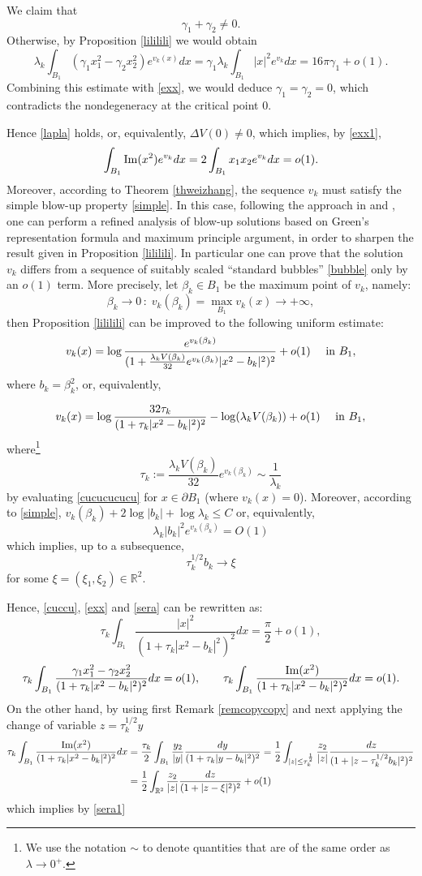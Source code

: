 \documentclass[reqno,11pt]{amsart}
\theoremstyle{definition}
\numberwithin{equation}{section}
\newcommand{\R}{\mathbb{R}}
\newcommand{\la}{\lambda}
\newcommand{\into}{\int_{B_1}}
\renewcommand{\(}{\left(}
\renewcommand{\)}{\right)}
\renewcommand{\[}{\left[}
\renewcommand{\]}{\right]}
\newcommand{\beq}{\begin{equation}}
\newcommand{\eeq}{\end{equation}}
\def\Im{{\rm Im}}
\begin{document}
{\medskip

We claim that 
\beq\label{lapla}\gamma_1+\gamma_2 \neq 0.\eeq Otherwise, by Proposition \ref{lililili} we would obtain 
$$\la_k\int_{B_1}(\gamma_1 x_1^2-\gamma_2 x_2^2) e^{v_k(x)}dx=\gamma_1 \la_k\int_{B_1}|x|^2 e^{v_k} dx =16\pi \gamma_1  +o(1).$$
Combining this estimate with \eqref{exx}, we would deduce $\gamma_1=\gamma_2=0$, which contradicts the nondegeneracy at the critical point $0$. 

Hence \eqref{lapla} holds, or, equivalently, $\Delta V(0)\neq 0$, which implies, by \eqref{exx1}, \beq\label{sera} \into \Im(x^2) e^{v_k} dx=2\into x_1x_2 e^{v_k} dx=o(1).\eeq Moreover, according to Theorem \ref{thweizhang},   the sequence $v_k$ must satisfy the simple blow-up property \eqref{simple}. 
In this case, following the approach in   \cite{gluck2012} and \cite{zhang2006}, one can perform  a refined analysis of blow-up solutions based on  Green’s representation formula and maximum principle argument,  in order to sharpen the result given in Proposition \ref{lililili}. 
 In particular one can prove that the solution
$v_k$ differs from a sequence of suitably scaled  “standard bubbles” \eqref{bubble} only by an 
$o(1)$  term.
More precisely, let $\beta_k\in B_1$ be the maximum point of $v_k$, namely: $$\beta_k\to 0 \, : \;v_k(\beta_k)=\max_{B_1} v_k(x)\to +\infty,$$
then Proposition \ref{lililili} can be improved to the following uniform estimate: 
$$v_k(x)= \log \frac{e^{v_k(\beta_k)}}{(1+ \frac{\la_k V(\beta_k)}{32 }e^{v_k(\beta_k)}|x^{2}-b_k|^2)^2}+o(1)\quad \hbox{ in }B_1,$$
 where $b_k=\beta_k^{2}$, or, equivalently,

\beq\label{cucucucucu}v_k(x)= \log \frac{32\tau_k}{(1+ \tau_k|x^{2}-b_k|^2)^2}-\log(\la_kV(\beta_k))+o(1)\quad \hbox{ in }B_1,\eeq
where\footnote{We use the notation $\sim$ to denote quantities that are of the same order as  $\la\to 0^+$. } $$\tau_k:=\frac{\la_k V(\beta_k)}{32}e^{v_k(\beta_k)}\sim\frac{1}{\la_k}$$ by evaluating \eqref{cucucucucu} for $x\in\partial B_1$ (where $v_k(x)=0$). Moreover, according to \eqref{simple},
$v_k(\beta_k)+2\log|b_k|+\log\la_k\leq C$ or, equivalently, $$\la_k|b_k|^2e^{v_k(\beta_k)}=O(1)$$ which implies, up to a subsequence,  $$\tau_k^{1/2}b_k\to \xi$$ for some $\xi=(\xi_1,\xi_2)\in\R^2$.

Hence, \eqref{cuccu}, \eqref{exx} and  \eqref{sera} can be rewritten as:
\beq\label{sera0} \tau_k\into   \frac{|x|^2}{(1+ \tau_k|x^{2}-b_k|^2)^2}  dx=\frac{\pi}{2}+o(1),\eeq 
 \beq\label{sera1}\tau_k\into   \frac{\gamma_1 x_1^2-\gamma_2 x_2^2}{(1+ \tau_k|x^{2}-b_k|^2)^2}  dx=o(1),\qquad\tau_k\into   \frac{\Im(x^2)}{(1+ \tau_k|x^{2}-b_k|^2)^2}  dx=o(1).\eeq
 On the other hand, by using first Remark \ref{remcopycopy} and next applying the change of variable  $z=\tau_k^{1/2} y$
$$\begin{aligned}\tau_k\into   \frac{\Im(x^2)}{(1+ \tau_k|x^{2}-b_k|^2)^2}  dx&=\frac{\tau_k}{2}\into  \frac{y_2}{|y|} \frac{dy}{(1+ \tau_k| y-b_k|^2)^2}  = \frac{1}{2}\int_{|z|\leq \tau_k^{\frac12}}  \frac{z_2}{|z|} \frac{dz}{(1+ | z-\tau_k^{1/2} b_k|^2)^2}  \\ &=\frac12\int_{\R^2}\frac{z_2}{|z|} \frac{dz}{(1+ | z-\xi|^2)^2}  +o(1)\end{aligned} $$
which implies by \eqref{sera1}

}
\end{document}
